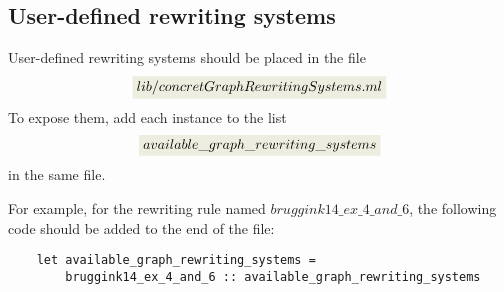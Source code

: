 \subsection{User-defined rewriting systems}
User-defined rewriting systems should be placed in the file 
    $$\colorbox{Ivory2}{$lib/concretGraphRewritingSystems.ml$}$$
 To expose them, add each instance to the list 
 $$\colorbox{Ivory2}{$available\_graph\_rewriting\_systems$}$$ in the same file.

For example, for the rewriting rule named \colorbox{Ivory2}{$bruggink14\_ex\_4\_and\_6$}, the following code should be added to the end of the file:
\begin{verbatim}
    let available_graph_rewriting_systems = 
        bruggink14_ex_4_and_6 :: available_graph_rewriting_systems 
\end{verbatim}

